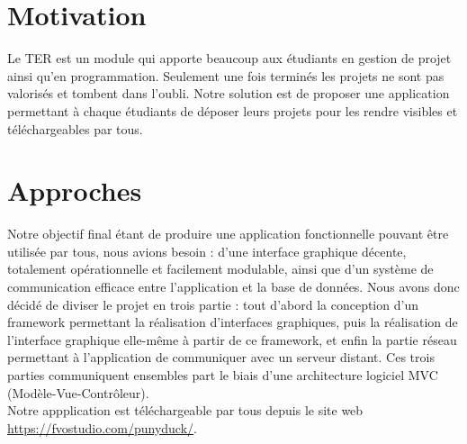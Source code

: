 \documentclass{report}
\begin{document}
\section*{Motivation}

Le TER est un module qui apporte beaucoup aux étudiants en gestion de projet ainsi qu'en programmation. Seulement une fois terminés les projets ne sont pas valorisés et tombent dans l'oubli. Notre solution est de proposer une application permettant à chaque étudiants de déposer leurs projets pour les rendre visibles et téléchargeables par tous.

\section*{Approches}
Notre objectif final étant de produire une application fonctionnelle pouvant être utilisée par tous, nous avions besoin : d'une interface graphique décente, totalement opérationnelle et facilement modulable, ainsi que d'un système de communication efficace entre l'application et la base de données. Nous avons donc décidé de diviser le projet en trois partie : tout d'abord la conception d'un framework permettant la réalisation d'interfaces graphiques, puis la réalisation de l'interface graphique elle-même à partir de ce framework, et enfin la partie réseau permettant à l'application de communiquer avec un serveur distant. Ces trois parties communiquent ensembles part le biais d'une architecture logiciel MVC (Modèle-Vue-Contrôleur).\\
Notre appplication est téléchargeable par tous depuis le site web \url{ https://fvostudio.com/punyduck/}.
\end{document}
